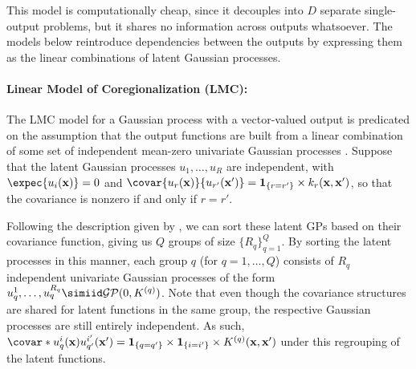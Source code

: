 \documentclass[10pt]{article}
\newcommand{\calGP}{\mathcal{GP}}
\begin{document}
This model is computationally cheap, since it decouples into $D$ separate single-output problems, but it shares no information across outputs whatsoever. The models below reintroduce dependencies between the outputs by expressing them as the linear combinations of latent Gaussian processes.

\paragraph{Linear Model of Coregionalization (LMC):} The LMC model for a Gaussian process with a vector-valued output is predicated on the assumption that the output functions are built from a linear combination of some set of independent mean-zero univariate Gaussian processes \citep{Alvarez-Vector-Kernels-2012}. Suppose that the latent Gaussian processes $u_{1}, \dots, u_{R}$ are independent, with $\expec{u_{i}(\bfx)} = 0$ and $\covar{u_{r}(\bfx)}{u_{r'}(\bfx')} = \mathbf{1}_{\{r = r'\}} \times k_{r}(\bfx, \bfx')$, so that the covariance is nonzero if and only if $r = r'$. 

Following the description given by \citet{Alvarez-Vector-Kernels-2012}, we can sort these latent GPs based on their covariance function, giving us $Q$ groups of size $\{R_{q}\}_{q=1}^{Q}$. By sorting the latent processes in this manner, each group $q$ (for $q = 1, \dots, Q$) consists of $R_{q}$ independent univariate Gaussian processes of the form $u_{q}^{1}, \dots, u_{q}^{R_{q}} \simiid \calGP(0, K^{(q)})$. Note that even though the covariance structures are shared for latent functions in the same group, the respective Gaussian processes are still entirely independent. As such, $\covar*{u_{q}^{i}(\bfx)}{u_{q'}^{i'}(\bfx')} = \mathbf{1}_{\{q = q'\}} \times \mathbf{1}_{\{i = i'\}} \times K^{(q)}(\bfx, \bfx')$ under this regrouping of the latent functions.
\end{document}

